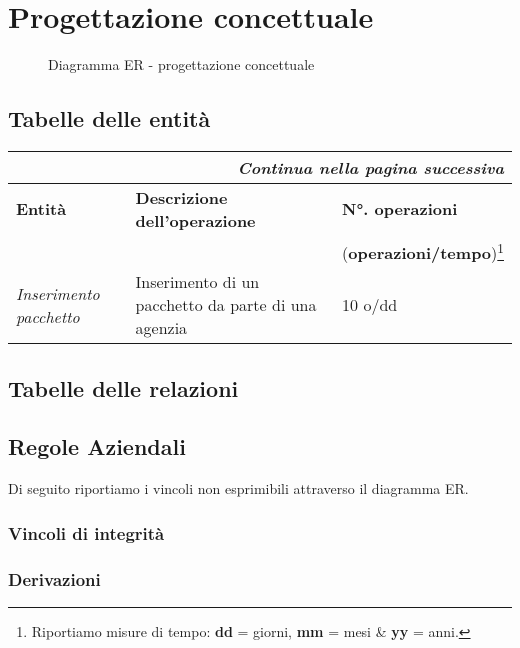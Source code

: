 \section{Progettazione concettuale}

\begin{figure}
    \centering
    \caption{Diagramma ER - progettazione concettuale}
    
    \label{fig:er_conp}
\end{figure}

\subsection{Tabelle delle entità}
\begin{center}
    \begin{tabularx}{\textwidth}{p{} X p{}}
        \caption{Tabella delle entità}\\\toprule\endfirsthead
        \toprule\endhead
        \midrule\multicolumn{3}{r}{\itshape Continua nella pagina successiva}\\\midrule\endfoot
        \bottomrule\endlastfoot
        \textbf{Entità} & \textbf{Descrizione dell'operazione} & \textbf{N°. operazioni}
        \\
        && (\textbf{operazioni/tempo})\footnote{Riportiamo misure di tempo: \textbf{dd} = giorni, \textbf{mm} = mesi \& \textbf{yy} = anni.}
        \\\midrule
        \emph{Inserimento pacchetto} & Inserimento di un pacchetto da parte di una agenzia & 10 o/dd
        \\
    \end{tabularx}
\end{center}

\subsection{Tabelle delle relazioni}

\subsection{Regole Aziendali}
Di seguito riportiamo i vincoli non esprimibili attraverso il diagramma ER.
\subsubsection{Vincoli di integrità}
\subsubsection{Derivazioni}
